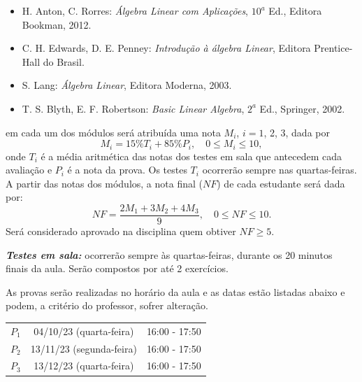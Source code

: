 \documentclass[12pt]{exam}
\begin{document}
\vspace{0.5cm}
\begin{itemize}


    \item H. Anton, C. Rorres: {\it Álgebra Linear com Aplicações}, $10^a$ Ed., Editora Bookman, 2012.

    \item C. H. Edwards, D. E. Penney: {\it Introdução à álgebra Linear}, Editora Prentice-Hall do Brasil.

    \item S. Lang: {\it Álgebra Linear}, Editora Moderna, 2003.

    \item T. S. Blyth, E. F. Robertson: {\it Basic Linear Algebra}, $2^a$ Ed., Springer, 2002.
\end{itemize}

 em cada um dos módulos será atribuída uma nota $M_i$, $i=1$, 2, 3, dada por
\[
    M_i = 15\%T_i + 85\%P_i, \quad 0 \le M_i \le 10,
\]
onde $T_i$ é a média aritmética das notas dos testes em sala que antecedem cada avaliação e $P_i$ é a nota da prova. Os testes $T_i$ ocorrerão sempre nas quartas-feiras.
A partir das notas dos módulos, a nota final ($NF$) de cada estudante será dada por:
\[
    NF = \dfrac{2M_1 + 3M_2 + 4M_3}{9}, \quad 0 \le NF \le 10.
\]
Será considerado aprovado na disciplina quem obtiver $NF \ge 5$.

\vspace{0.5cm}

\noindent \textbf{\textit{Testes em sala:}} ocorrerão sempre às quartas-feiras, durante os 20 minutos finais da aula. Serão compostos por até 2 exercícios.


As provas serão realizadas no horário da aula e as datas estão listadas abaixo e podem, a critério do professor, sofrer alteração.

\begin{center}
    \begin{tabular}{c|c|c}
        \hline\hline
        \hspace{1cm}{\bf Prova}\hspace{1cm} & \hspace{3cm}{\bf Data}\hspace{3cm} & \hspace{1.7cm}{\bf Horário}\hspace{1.7cm} \\
        \hline\hline
        $P_1$ & 04/10/23 (quarta-feira) \phantom{x} & 16:00 - 17:50 \\
        \hline
        $P_2$ & 13/11/23 (segunda-feira) \phantom{x} & 16:00 - 17:50 \\
        \hline
        $P_3$ & 13/12/23 (quarta-feira) \phantom{x} & 16:00 - 17:50 \\
        \hline\hline
    \end{tabular}
\end{center}
\end{document}
